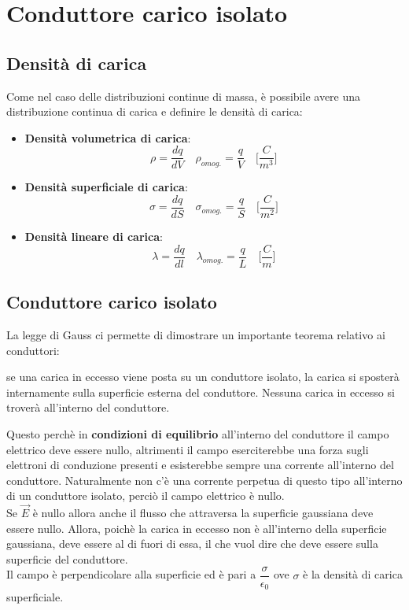 \documentclass[12pt]{report}
\begin{document}
	\section{Conduttore carico isolato}
	\subsection{Densità di carica}
	Come nel caso delle distribuzioni continue di massa, è possibile avere una distribuzione continua di carica e definire le densità di carica:
	\begin{itemize}
		\item \textbf{Densità volumetrica di carica}:
		\[
		\rho = \frac{dq}{dV} \quad \rho_{omog.} = \frac{q}{V} \quad \bigg[\frac{C}{m^3}\bigg]
		\]
		\item \textbf{Densità superficiale di carica}:
		\[
		\sigma = \frac{dq}{dS} \quad \sigma_{omog.} = \frac{q}{S} \quad \bigg[\frac{C}{m^2}\bigg]
		\]
		\item \textbf{Densità lineare di carica}:
		\[
		\lambda = \frac{dq}{dl} \quad \lambda_{omog.} = \frac{q}{L} \quad \bigg[\frac{C}{m}\bigg]
		\]
	\end{itemize}
	\subsection{Conduttore carico isolato}
	La legge di Gauss ci permette di dimostrare un importante teorema relativo ai conduttori:
	\begin{center}
		se una carica in eccesso viene posta su un conduttore isolato, la carica si sposterà internamente sulla superficie esterna del conduttore. Nessuna carica in eccesso si troverà all'interno del conduttore.
	\end{center}
	Questo perchè in \textbf{condizioni di equilibrio} all'interno del conduttore il campo elettrico deve essere nullo, altrimenti il campo eserciterebbe una forza sugli elettroni di conduzione presenti e esisterebbe sempre una corrente all'interno del conduttore. Naturalmente non c'è una corrente perpetua di questo tipo all'interno di un conduttore isolato, perciò il campo elettrico è nullo. \\
	Se $\vec{E}$ è nullo allora anche il flusso che attraversa la superficie gaussiana deve essere nullo. Allora, poichè la carica in eccesso non è all'interno della superficie gaussiana, deve essere al di fuori di essa, il che vuol dire che deve essere sulla superficie del conduttore. \\
	Il campo è perpendicolare alla superficie ed è pari a $\dfrac{\sigma}{\epsilon_0}$ ove $\sigma$ è la densità di carica superficiale.
\end{document}
